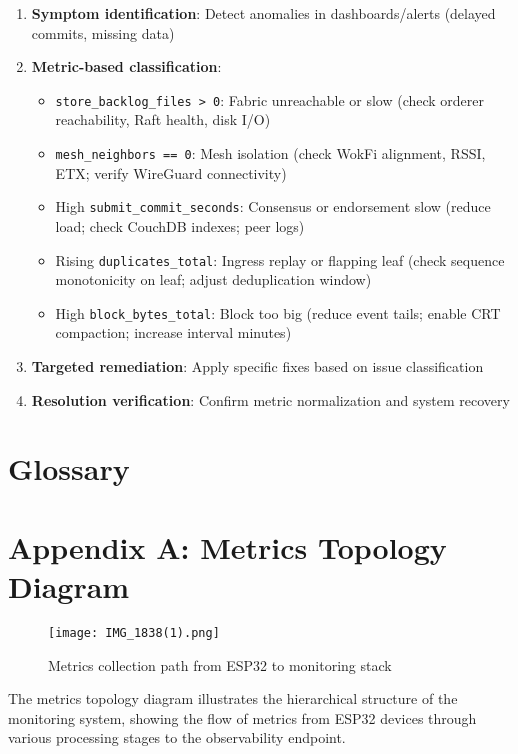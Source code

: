 \documentclass[12pt]{article}
\begin{document}
\begin{enumerate}
    \item \textbf{Symptom identification}: Detect anomalies in dashboards/alerts (delayed commits, missing data)
    \item \textbf{Metric-based classification}:
    \begin{itemize}
        \item \texttt{store\_backlog\_files > 0}: Fabric unreachable or slow (check orderer reachability, Raft health, disk I/O)
        \item \texttt{mesh\_neighbors == 0}: Mesh isolation (check WokFi alignment, RSSI, ETX; verify WireGuard connectivity)
        \item High \texttt{submit\_commit\_seconds}: Consensus or endorsement slow (reduce load; check CouchDB indexes; peer logs)
        \item Rising \texttt{duplicates\_total}: Ingress replay or flapping leaf (check sequence monotonicity on leaf; adjust deduplication window)
        \item High \texttt{block\_bytes\_total}: Block too big (reduce event tails; enable CRT compaction; increase interval minutes)
    \end{itemize}
    \item \textbf{Targeted remediation}: Apply specific fixes based on issue classification
    \item \textbf{Resolution verification}: Confirm metric normalization and system recovery
\end{enumerate}

\section{Glossary}
\label{sec:glossary}
\printglossaries

\clearpage
\appendix

\section{Appendix A: Metrics Topology Diagram}
\label{app:topology}

\begin{figure}[H]
    \centering
    \texttt{[image: IMG\_1838(1).png]}
    \caption{Metrics collection path from ESP32 to monitoring stack}
    \label{fig:metrics-topology}
\end{figure}
The metrics topology diagram illustrates the hierarchical structure of the monitoring system, showing the flow of metrics from ESP32 devices through various processing stages to the observability endpoint.
\end{document}
